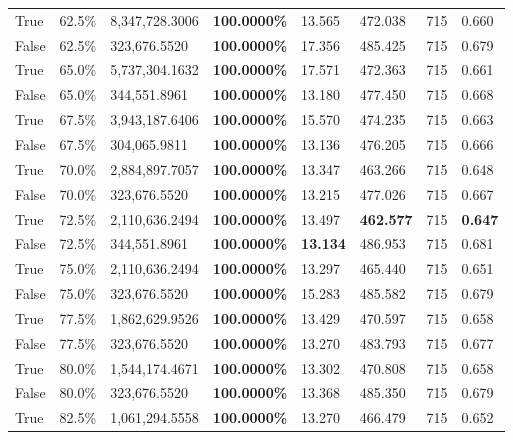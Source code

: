\begin{table}[H]
\begin{tabular}{lllrllll}
\cline{1-8}
True & 62.5\% & 8,347,728.3006 & \bfseries \color{red} 100.0000\% & 13.565 & 472.038 & 715 & 0.660 \\
\cline{1-8}
False & 62.5\% & 323,676.5520 & \bfseries \color{red} 100.0000\% & 17.356 & 485.425 & 715 & 0.679 \\
\cline{1-8}
True & 65.0\% & 5,737,304.1632 & \bfseries \color{red} 100.0000\% & 17.571 & 472.363 & 715 & 0.661 \\
\cline{1-8}
False & 65.0\% & 344,551.8961 & \bfseries \color{red} 100.0000\% & 13.180 & 477.450 & 715 & 0.668 \\
\cline{1-8}
True & 67.5\% & 3,943,187.6406 & \bfseries \color{red} 100.0000\% & 15.570 & 474.235 & 715 & 0.663 \\
\cline{1-8}
False & 67.5\% & \color{red} 304,065.9811 & \bfseries \color{red} 100.0000\% & 13.136 & 476.205 & 715 & 0.666 \\
\cline{1-8}
True & 70.0\% & 2,884,897.7057 & \bfseries \color{red} 100.0000\% & 13.347 & 463.266 & 715 & 0.648 \\
\cline{1-8}
False & 70.0\% & 323,676.5520 & \bfseries \color{red} 100.0000\% & 13.215 & 477.026 & 715 & 0.667 \\
\cline{1-8}
True & 72.5\% & 2,110,636.2494 & \bfseries \color{red} 100.0000\% & 13.497 & \bfseries \color{red} 462.577 & 715 & \bfseries \color{red} 0.647 \\
\cline{1-8}
False & 72.5\% & 344,551.8961 & \bfseries \color{red} 100.0000\% & \bfseries \color{red} 13.134 & 486.953 & 715 & 0.681 \\
\cline{1-8}
True & 75.0\% & 2,110,636.2494 & \bfseries \color{red} 100.0000\% & 13.297 & 465.440 & 715 & 0.651 \\
\cline{1-8}
False & 75.0\% & 323,676.5520 & \bfseries \color{red} 100.0000\% & 15.283 & 485.582 & 715 & 0.679 \\
\cline{1-8}
True & 77.5\% & 1,862,629.9526 & \bfseries \color{red} 100.0000\% & 13.429 & 470.597 & 715 & 0.658 \\
\cline{1-8}
False & 77.5\% & 323,676.5520 & \bfseries \color{red} 100.0000\% & 13.270 & 483.793 & 715 & 0.677 \\
\cline{1-8}
True & 80.0\% & 1,544,174.4671 & \bfseries \color{red} 100.0000\% & 13.302 & 470.808 & 715 & 0.658 \\
\cline{1-8}
False & 80.0\% & 323,676.5520 & \bfseries \color{red} 100.0000\% & 13.368 & 485.350 & 715 & 0.679 \\
\cline{1-8}
True & 82.5\% & 1,061,294.5558 & \bfseries \color{red} 100.0000\% & 13.270 & 466.479 & 715 & 0.652 \\

\end{tabular}
\end{table}
